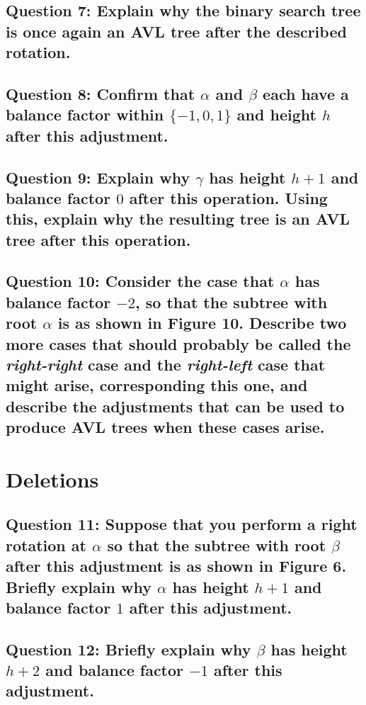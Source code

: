 \documentclass[a4paper, 12pt, titlepage]{article}
\begin{document}
\subsection*{Question 7: Explain why the binary search tree is once again an AVL tree after the described rotation.} 

\subsection*{Question 8: Confirm that $\alpha$ and $\beta$ each have a balance factor within $\{−1, 0, 1\}$ and height $h$ after this adjustment.} 

\subsection*{Question 9: Explain why $\gamma$ has height $h+1$ and balance factor $0$ after this operation. Using this, explain why the resulting tree is an AVL tree after this operation.} 

\subsection*{Question 10: Consider the case that $\alpha$ has balance factor $-2$, so that the subtree with root $\alpha$ is as shown in Figure 10. Describe two more cases that should probably be called the \textit{right-right} case and the \textit{right-left} case that might arise, corresponding this one, and describe the adjustments that can be used to produce AVL trees when these cases arise.} 

\section*{Deletions}

\subsection*{Question 11: Suppose that you perform a right rotation at $\alpha$ so that the subtree with root $\beta$ after this adjustment is as shown in Figure 6. Briefly explain why $\alpha$ has height $h+1$ and balance factor $1$ after this adjustment.} 

\subsection*{Question 12: Briefly explain why $\beta$ has height $h+2$ and balance factor $-1$ after this adjustment.} 
\end{document}
